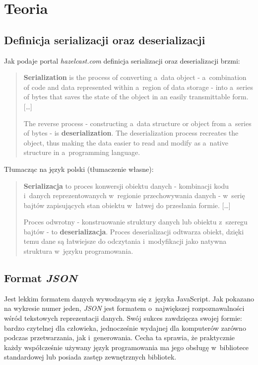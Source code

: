 \documentclass[12pt]{article}
\newcommand{\n}{\newline}
\newcommand{\nonpl}[1]{{\it #1}}
\newcommand{\JSON}{\nonpl{JSON} }
\begin{document}
	{
		\section{Teoria}

		{
			\subsection{Definicja serializacji oraz deserializacji}

			Jak podaje portal \nonpl{hazelcast.com}\cite{definitions_serial_and_deserial} definicja serializacji oraz deserializacji brzmi:

			\begin{quotation}
				{\bf Serialization} is the process of converting a~data object - a~combination of code
				and data represented within a~region of data storage - into a~series of bytes that
				saves the state of the object in an easily transmittable form. [\ldots]\n

				The reverse process - constructing a~data structure or object from a~series of
				bytes - is {\bf deserialization}. The deserialization process recreates the object,
				thus making the data easier to read and modify as a~native structure in a~programming language.
			\end{quotation}

			{\noindent Tłumacząc na język polski (tłumaczenie własne):}

			\begin{quotation}
				{\bf Serializacja} to proces konwersji obiektu danych - kombinacji kodu i~danych
				reprezentowanych w~regionie przechowywania danych - w~serię bajtów zapisujących
				stan obiektu w~łatwej do przesłania formie. [\ldots] \n

				Proces odwrotny - konstruowanie struktury danych lub obiektu z~szeregu
				bajtów - to {\bf deserializacja}. Proces deserializacji odtwarza obiekt,
				dzięki temu dane są łatwiejsze do odczytania i~modyfikacji jako
				natywna struktura w~języku programowania.
			\end{quotation}
		}

		{
			\newpage
			\subsection{Format \JSON}

			Jest lekkim formatem danych wywodzącym się z~języka JavaScript. Jak pokazano na wykresie numer jeden,
			\JSON jest formatem o~największej rozpoznawalności wśród tekstowych reprezentacji danych. Swój sukces
			zawdzięcza swojej formie: bardzo czytelnej dla człowieka, jednocześnie wydajnej dla komputerów zarówno
			podczas przetwarzania, jak i~generowania. Cecha ta sprawia, że praktycznie każdy współcześnie używany język
			programowania ma jego obsługę\cite{json_short} w~bibliotece standardowej lub posiada zastęp zewnętrznych
			bibliotek.\n

}}
\end{document}
